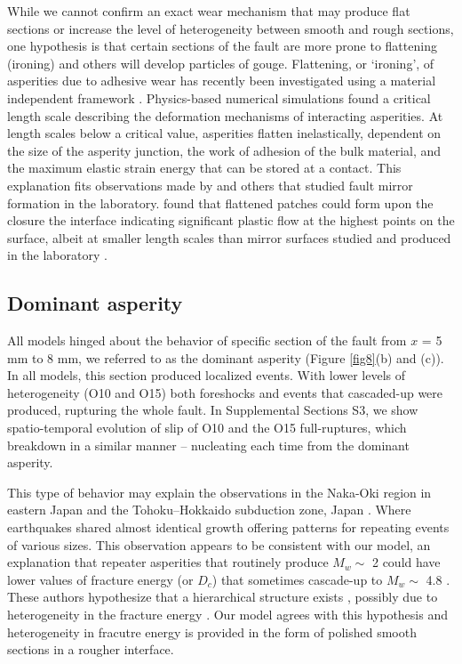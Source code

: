 \documentclass[preprint,1p, 10pt,authoryear]{elsarticle}
\begin{document}
While we cannot confirm an exact wear mechanism that may produce flat sections or increase the level of heterogeneity between smooth and rough sections, one hypothesis is that certain sections of the fault are more prone to flattening (ironing) and others will develop particles of gouge. Flattening, or ‘ironing’, of asperities due to adhesive wear has recently been investigated using a material independent framework \citep{Aghababaei2016}. Physics-based numerical simulations found a critical length scale describing the deformation mechanisms of interacting asperities. At length scales below a critical value, asperities flatten inelastically, dependent on the size of the asperity junction, the work of adhesion of the bulk material, and the maximum elastic strain energy that can be stored at a contact. This explanation fits observations made by \citet{Siman-Tov2013} and others that studied fault mirror formation in the laboratory. \citet{Brown1986} found that flattened patches could form upon the closure the interface indicating significant  plastic flow at the highest points on the surface, albeit at smaller length scales than mirror surfaces studied and produced in the laboratory \citep{Fondriest2013,Siman-Tov2013, Tisato2012,Siman-Tov2015}.

\subsection{Dominant asperity}
All models hinged about the behavior of specific section of the fault from $x$ = 5 mm to 8 mm, we referred to as the dominant asperity (Figure \ref{fig8}(b) and (c)). In all models, this section produced localized events. With lower levels of heterogeneity (O10 and O15) both foreshocks and events that cascaded-up were produced, rupturing the whole fault. In Supplemental Sections S3, we show spatio-temporal evolution of slip of O10 and the O15 full-ruptures, which breakdown in a similar manner -- nucleating each time from the dominant asperity.

This type of behavior may explain the observations in the Naka-Oki region in eastern Japan \citep{Okuda2018} and the Tohoku–Hokkaido subduction zone, Japan \citep{Ide2019}. Where earthquakes shared almost identical growth offering patterns for repeating events of various sizes. This observation appears to be consistent with our model, an explanation that repeater asperities that routinely produce  $M_{w} \sim$ 2 could have lower values of fracture energy (or $D_{c}$) that sometimes cascade-up to  $M_{w} \sim$ 4.8 \citep{Okuda2018a}.  These authors hypothesize that a hierarchical structure exists \citep[as depicted in fig. 5 of ][]{Okuda2018}, possibly due to heterogeneity in the fracture energy \citep{Ide2005, Aochi2014, Aochi2017}. Our model agrees with this hypothesis and heterogeneity in fracutre energy is provided in the form of polished smooth sections in a rougher interface. 
\end{document}
